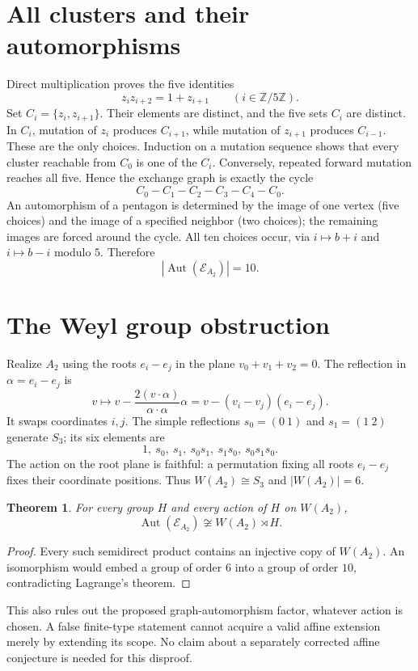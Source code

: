 \documentclass[11pt]{article}
\newtheorem{theorem}{Theorem}
\newcommand{\Aut}{\operatorname{Aut}}
\begin{document}
\section*{All clusters and their automorphisms}
Direct multiplication proves the five identities
\[
 z_i z_{i+2}=1+z_{i+1}\qquad(i\in\mathbb Z/5\mathbb Z).
\]
Set $C_i=\{z_i,z_{i+1}\}$. Their elements are distinct, and the five
sets $C_i$ are distinct. In $C_i$, mutation of $z_i$ produces
$C_{i+1}$, while mutation of $z_{i+1}$ produces $C_{i-1}$.
These are the only choices. Induction on a mutation sequence shows
that every cluster reachable from $C_0$ is one of the $C_i$.
Conversely, repeated forward mutation reaches all five. Hence the
exchange graph is exactly the cycle
\[
 C_0-C_1-C_2-C_3-C_4-C_0.
\]
An automorphism of a pentagon is determined by the image of one
vertex (five choices) and the image of a specified neighbor (two
choices); the remaining images are forced around the cycle.
All ten choices occur, via $i\mapsto b+i$ and $i\mapsto b-i$ modulo
$5$. Therefore
\[
 |\Aut(\mathcal E_{A_2})|=10.
\]

\section*{The Weyl group obstruction}
Realize $A_2$ using the roots $e_i-e_j$ in the plane
$v_0+v_1+v_2=0$. The reflection in $\alpha=e_i-e_j$ is
\[
 v\longmapsto v-\frac{2(v\cdot\alpha)}{\alpha\cdot\alpha}\alpha
   =v-(v_i-v_j)(e_i-e_j).
\]
It swaps coordinates $i,j$. The simple reflections
$s_0=(0\ 1)$ and $s_1=(1\ 2)$ generate $S_3$; its six elements are
\[
 1,\ s_0,\ s_1,\ s_0s_1,\ s_1s_0,\ s_0s_1s_0.
\]
The action on the root plane is faithful: a permutation fixing all
roots $e_i-e_j$ fixes their coordinate positions. Thus
$W(A_2)\cong S_3$ and $|W(A_2)|=6$.

\begin{theorem}
For every group $H$ and every action of $H$ on $W(A_2)$,
\[
 \Aut(\mathcal E_{A_2})\not\cong W(A_2)\rtimes H.
\]
\end{theorem}
\begin{proof}
Every such semidirect product contains an injective copy of
$W(A_2)$. An isomorphism would embed a group of order $6$ into a
group of order $10$, contradicting Lagrange's theorem.
\end{proof}
This also rules out the proposed graph-automorphism factor, whatever
action is chosen. A false finite-type statement cannot acquire a
valid affine extension merely by extending its scope. No claim about
a separately corrected affine conjecture is needed for this disproof.
\end{document}
